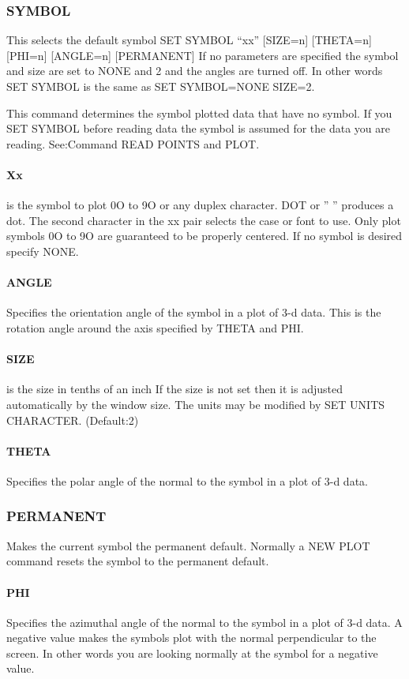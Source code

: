 \subsubsection{SYMBOL}
This selects the default symbol 
SET SYMBOL ``xx'' [SIZE=n] [THETA=n] [PHI=n] [ANGLE=n] [PERMANENT] 
If  no parameters are specified the symbol and size are set to NONE and
2 and the angles are turned off.  In other words SET SYMBOL is the same
as SET SYMBOL=NONE SIZE=2.  

This  command  determines  the symbol plotted data that have no symbol.
If you SET SYMBOL before reading data the symbol  is  assumed  for  the
data you are reading.  See:Command READ POINTS and PLOT.  
\paragraph{Xx}
is  the symbol to plot 0O to 9O or any duplex character.  DOT or ''  ''
produces a dot.  The second character in the xx pair selects the case
or  font  to  use.   Only  plot symbols 0O to 9O are guaranteed to be
properly centered.  If no symbol is desired specify NONE.  
\paragraph{ANGLE}
Specifies  the orientation angle of the symbol in a plot of 3-d data.
This is the rotation angle around the axis  specified  by  THETA  and
PHI.  
\paragraph{SIZE}
is  the  size  in tenths of an inch If the size is not set then it is
adjusted automatically by the window size.  The units may be modified
by SET UNITS CHARACTER.  
(Default:2) 
\paragraph{THETA}
Specifies  the  polar  angle of the normal to the symbol in a plot of
3-d data.  
\subsubsection{PERMANENT}
Makes  the  current  symbol the permanent default.  Normally a NEW PLOT
command resets the symbol to the permanent default.  
\paragraph{PHI}
Specifies  the  azimuthal angle of the normal to the symbol in a plot
of 3-d data.  A negative value makes the symbols plot with the normal
perpendicular to the screen.  In other words you are looking normally
at the symbol for a negative value.  
